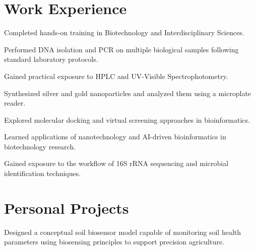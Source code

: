 \documentclass[]{kajalverse-resume}
\begin{document}
\begin{minipage}[t]{0.66\textwidth}


\section{Work Experience}
\runsubsection{}
\vspace{\topsep}
\begin{tightemize}
\item  Completed hands-on training in Biotechnology and Interdisciplinary Sciences.
% 
\textbf{\textit{}} 
\item  Performed DNA isolation and PCR on multiple biological samples following standard laboratory protocols. 

\item  Gained practical exposure to HPLC and UV-Visible Spectrophotometry.

\item Synthesized silver and gold nanoparticles and analyzed  them using a microplate reader.

\item Explored molecular docking and virtual screening approaches in bioinformatics.

\item Learned applications of nanotechnology and AI-driven bioinformatics in biotechnology research.
\item Gained exposure to the workflow of 16S rRNA sequencing and microbial identification techniques.
\end{tightemize}


\section{Personal Projects}




\begin{tightemize}
\item Designed a conceptual soil biosensor model capable of monitoring soil health parameters using biosensing principles to support precision agriculture.
\end{tightemize}


\end{minipage}
\end{document}
